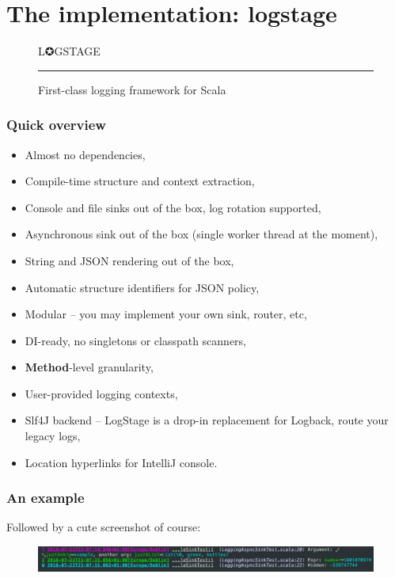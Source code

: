 \documentclass[usenames,dvipsnames]{beamer}
\begin{document}
\section{The implementation: logstage}

\begin{frame}
\begin{figure}
\Huge 
\color{RubineRed} L✪GSTAGE
\noindent
{\color{RubineRed} \rule{\linewidth}{1mm} }
\Large First-class logging framework for Scala
\end{figure}
\end{frame}

\begin{frame}
\frametitle{Quick overview}
\begin{itemize}
\item Almost no dependencies,
\item Compile-time structure and context extraction,
\item Console and file sinks out of the box, log rotation supported,
\item Asynchronous sink out of the box (single worker thread at the moment),
\item String and JSON rendering out of the box,
\item Automatic structure identifiers for JSON policy,
\item Modular -- you may implement your own sink, router, etc,
\item DI-ready, no singletons or classpath scanners,
\item \textbf{Method}-level granularity,
\item User-provided logging contexts,
\item Slf4J backend -- LogStage is a drop-in replacement for Logback, route your legacy logs,
\item Location hyperlinks for IntelliJ console.
\end{itemize}
\end{frame}

\begin{frame}
\frametitle{An example}
Followed by a cute screenshot of course:
\begin{figure}
    \includegraphics[width=\textwidth]{media/logstage-console.png}
\end{figure}
\end{frame}
\end{document}
